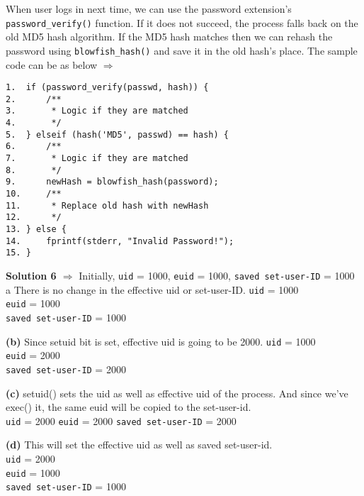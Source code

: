 \documentclass[11pt]{article}
\newcommand\question[3]{{\textbf{Solution #1 $\Rightarrow$} #2} \vspace{.10in}\\}
\renewcommand\part[1]{\vspace{.10in}\textbf{(#1)}}
\begin{document}
When user logs in next time, we can use the password extension's \texttt{password\_verify()} function. If it does not succeed, the process falls back on the old MD5 hash algorithm. If the MD5 hash matches then we can rehash the password using  \texttt{blowfish\_hash()} and save it in the old hash's place. The sample code can be as below $\Rightarrow$ 
\begin{verbatim}
1.  if (password_verify(passwd, hash)) {
2.      /**
3.       * Logic if they are matched
4.       */ 
5.  } elseif (hash('MD5', passwd) == hash) {
6.      /**
7.       * Logic if they are matched
8.       */ 
9.      newHash = blowfish_hash(password);
10.     /**
11.      * Replace old hash with newHash
12.      */ 
13. } else {
14.     fprintf(stderr, "Invalid Password!");
15. }
\end{verbatim}

\hrulefill

\question{6} {Initially, \texttt{uid} = 1000, \texttt{euid} = 1000, \texttt{saved set-user-ID} = 1000}

\part{a} There is no change in the effective uid or set-user-ID.
\texttt{uid} = 1000 \\
\texttt{euid} = 1000 \\
\texttt{saved set-user-ID} = 1000 


\part{b} Since setuid bit is set, effective uid is going to be 2000.
\texttt{uid} = 1000 \\
\texttt{euid} = 2000 \\
\texttt{saved set-user-ID} = 2000

\part{c} setuid() sets the uid as well as effective uid of the process. And since we've exec() it, the same euid will be copied to the set-user-id. \\
\texttt{uid} = 2000 \texttt{euid} = 2000 \texttt{saved set-user-ID} = 2000

\part{d} This will set the effective uid as well as saved set-user-id.\\
\texttt{uid} = 2000 \\
\texttt{euid} = 1000 \\
\texttt{saved set-user-ID} = 1000
\end{document}
